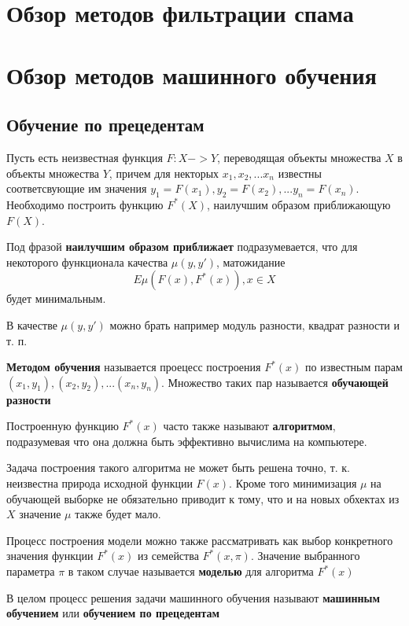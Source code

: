 \newpage
\section{Обзор методов фильтрации спама}
\label{review}

\section{Обзор методов машинного обучения}
\subsection{Обучение по прецедентам}
Пусть есть неизвестная функция $F: X -> Y$, переводящая объекты
множества $X$ в объекты множества $Y$, причем для некторых $x_1, x_2, ... x_n$ известны соответсвующие им значения $y_1 = F(x_1), y_2 = F(x_2), ... y_n = F(x_n)$.
Необходимо построить функцию $F^*(X)$, наилучшим образом приближающую $F(X)$.

Под фразой \textbf{наилучшим образом приближает} подразумевается, что для некоторого функционала качества $\mu(y, y')$, матожидание
\begin{equation}
\label{}
E\mu(F(x), F^*(x)), x \in X
\end{equation}
будет минимальным.

В качестве $\mu(y, y')$ можно брать например модуль разности, квадрат разности и т. п.

\textbf{Методом обучения} называется проецесс построения $F^*(x)$ по известным парам $(x_1, y_1), (x_2, y_2), ... (x_n, y_n)$. Множество таких пар называется \textbf{обучающей разности}

Построенную функцию $F^*(x)$ часто также называют \textbf{алгоритмом}, подразумевая что она должна быть эффективно вычислима на компьютере.

Задача построения такого алгоритма не может быть решена точно, т. к. неизвестна природа исходной функции $F(x)$. Кроме того минимизация $\mu$ на обучающей выборке не обязательно приводит к тому, что и на новых обхектах из $X$ значение $\mu$ также будет мало.

Процесс построения модели можно также рассматривать как выбор конкретного значения функции $F^*(x)$ из семейства $F^*(x, \pi)$. Значение выбранного параметра $\pi$ в таком случае называется \textbf{моделью} для алгоритма
$F^*(x)$

В целом процесс решения задачи машинного обучения называют \textbf{машинным обучением} или \textbf{обучением по прецедентам}

